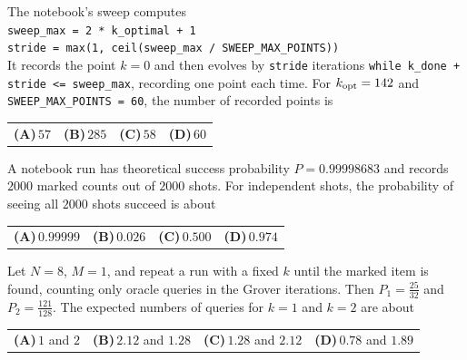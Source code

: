\documentclass[11pt,a4paper]{article}
\newcommand{\optlabel}[1]{\textbf{(#1)}}
\newenvironment{qitem}[1]{\begin{list}{}{\setlength{\leftmargin}{3.3em}\setlength{\labelwidth}{3.1em}%
  \setlength{\labelsep}{0.2em}\setlength{\topsep}{3pt}\setlength{\parsep}{3pt}}\item[\textbf{Q.#1}\hfill]}{\end{list}}
\newcommand{\qsep}{\par\vspace{2pt}{\color{black!15}\hrule}\vspace{4pt}}
\begin{document}
\begin{qitem}{72}
The notebook's sweep computes\\
\hspace*{1em}\texttt{sweep\_max = 2 * k\_optimal + 1}\\
\hspace*{1em}\texttt{stride = max(1, ceil(sweep\_max / SWEEP\_MAX\_POINTS))}\\
It records the point $k = 0$ and then evolves by \texttt{stride} iterations \texttt{while k\_done + stride <= sweep\_max}, recording one point each time. For $k_{\rm opt} = 142$ and \texttt{SWEEP\_MAX\_POINTS = 60}, the number of recorded points is
\par\smallskip\noindent\begin{tabularx}{\linewidth}{@{}*{4}{L}@{}}
\optlabel{A}\,$57$ & \optlabel{B}\,$285$ & \optlabel{C}\,$58$ & \optlabel{D}\,$60$
\end{tabularx}
\end{qitem}
\qsep

\begin{qitem}{73}
A notebook run has theoretical success probability $P = 0.99998683$ and records $2000$ marked counts out of $2000$ shots. For independent shots, the probability of seeing all $2000$ shots succeed is about
\par\smallskip\noindent\begin{tabularx}{\linewidth}{@{}*{4}{L}@{}}
\optlabel{A}\,$0.99999$ & \optlabel{B}\,$0.026$ & \optlabel{C}\,$0.500$ & \optlabel{D}\,$0.974$
\end{tabularx}
\end{qitem}
\qsep

\begin{qitem}{74}
Let $N = 8$, $M = 1$, and repeat a run with a fixed $k$ until the marked item is found, counting only oracle queries in the Grover iterations. Then $P_1 = \frac{25}{32}$ and $P_2 = \frac{121}{128}$. The expected numbers of queries for $k = 1$ and $k = 2$ are about
\par\smallskip\noindent\begin{tabularx}{\linewidth}{@{}*{4}{L}@{}}
\optlabel{A}\,$1$ and $2$ & \optlabel{B}\,$2.12$ and $1.28$ & \optlabel{C}\,$1.28$ and $2.12$ & \optlabel{D}\,$0.78$ and $1.89$
\end{tabularx}
\end{qitem}
\qsep
\end{document}
